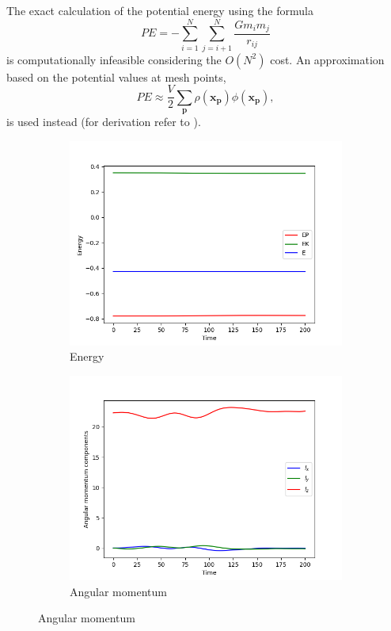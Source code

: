 The exact calculation of the potential energy \cite{taylor2005classical} using the formula
\begin{equation*}
    PE = -\sum_{i=1}^{N}\sum_{j=i+1}^{N}\frac{G m_i m_j}{r_{ij}}
\end{equation*}
is computationally infeasible considering the $O(N^2)$ cost.
An approximation based on the potential values at mesh points,
\begin{equation*}
    PE \approx \frac{V}{2}\sum_{\mathbf{p}} \rho(\mathbf{x}_\mathbf{p})\phi(\mathbf{x}_\mathbf{p}),
\end{equation*}
is used instead (for derivation refer to \cite{Hockney1988}).
\begin{figure}[htp]
    \centering
    \begin{subfigure}[b]{0.45\textwidth}
        \centering
        \includegraphics[width=\textwidth]{img/pm/energy.png}
        \caption{Energy}
        \label{fig:physical-quantities-pm-sub1}
    \end{subfigure}
    \hfill
    \begin{subfigure}[b]{0.45\textwidth}
        \centering
        \includegraphics[width=\textwidth]{img/pm/angular-momentum.png}
        \caption{Angular momentum}
        \label{fig:physical-quantities-pm-sub2}
    \end{subfigure}


\end{figure}
